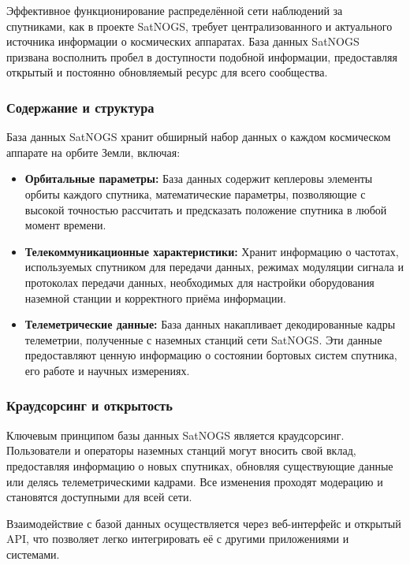 \documentclass[12pt, a4paper]{extreport}
\begin{document}
Эффективное функционирование распределённой сети наблюдений за спутниками, как в проекте SatNOGS, требует централизованного и актуального источника информации о космических аппаратах.  База данных SatNOGS призвана восполнить пробел в доступности подобной информации, предоставляя открытый и постоянно обновляемый ресурс для всего сообщества.

\subsubsection{Содержание и структура}

База данных SatNOGS хранит обширный набор данных о каждом космическом аппарате на орбите Земли, включая:

\begin{itemize}
    \item \textbf{Орбитальные параметры:} База данных содержит кеплеровы элементы орбиты каждого спутника,  математические параметры, позволяющие с высокой точностью  рассчитать и предсказать положение спутника в любой момент времени.
    \item \textbf{Телекоммуникационные характеристики:} Хранит информацию о частотах, используемых спутником для передачи данных,  режимах модуляции сигнала  и протоколах передачи данных, необходимых для настройки оборудования наземной станции  и корректного приёма информации.
    \item \textbf{Телеметрические данные:}  База данных накапливает декодированные кадры телеметрии, полученные с наземных станций сети SatNOGS. Эти данные предоставляют ценную информацию о состоянии бортовых систем спутника, его работе и научных измерениях.
\end{itemize}

\subsubsection{Краудсорсинг и открытость}

Ключевым принципом базы данных SatNOGS является краудсорсинг. Пользователи и операторы наземных станций могут вносить свой вклад, предоставляя информацию о новых спутниках, обновляя существующие данные или делясь телеметрическими кадрами. Все изменения проходят модерацию и становятся доступными для всей сети.

Взаимодействие с базой данных осуществляется через веб-интерфейс и открытый API, что позволяет легко интегрировать её с другими приложениями и системами.
\end{document}
